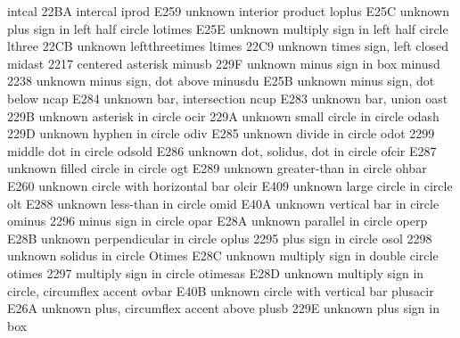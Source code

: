  intcal                22BA {\intercal} intercal
 iprod                 E259 {unknown} interior product
 loplus                E25C {unknown} plus sign in left half circle
 lotimes               E25E {unknown} multiply sign in left half circle
 lthree                22CB {unknown} leftthreetimes
 ltimes                22C9 {unknown} times sign, left closed
 midast                2217 {\ast} centered asterisk
 minusb                229F {unknown} minus sign in box
 minusd                2238 {unknown} minus sign, dot above
 minusdu               E25B {unknown} minus sign, dot below
 ncap                  E284 {unknown} bar, intersection
 ncup                  E283 {unknown} bar, union
 oast                  229B {unknown} asterisk in circle
 ocir                  229A {unknown} small circle in circle
 odash                 229D {unknown} hyphen in circle
 odiv                  E285 {unknown} divide in circle
 odot                  2299 {\odot} middle dot in circle
 odsold                E286 {unknown} dot, solidus, dot in circle
 ofcir                 E287 {unknown} filled circle in circle
 ogt                   E289 {unknown} greater-than in circle
 ohbar                 E260 {unknown} circle with horizontal bar
 olcir                 E409 {unknown} large circle in circle
 olt                   E288 {unknown} less-than in circle
 omid                  E40A {unknown} vertical bar in circle
 ominus                2296 {\ominus} minus sign in circle
 opar                  E28A {unknown} parallel in circle
 operp                 E28B {unknown} perpendicular in circle
 oplus                 2295 {\oplus} plus sign in circle
 osol                  2298 {unknown} solidus in circle
 Otimes                E28C {unknown} multiply sign in double circle
 otimes                2297 {\otimes} multiply sign in circle
 otimesas              E28D {unknown} multiply sign in circle, circumflex accent
 ovbar                 E40B {unknown} circle with vertical bar
 plusacir              E26A {unknown} plus, circumflex accent above
 plusb                 229E {unknown} plus sign in box

